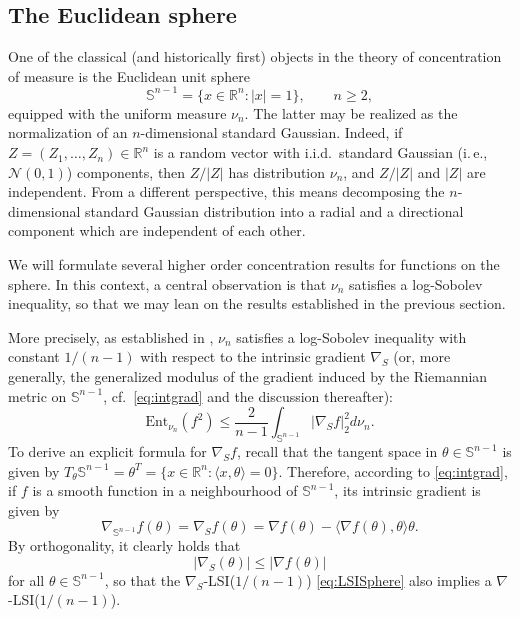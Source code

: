 \documentclass[a4paper,12pt]{amsart}
\numberwithin{equation}{section}
\theoremstyle{remark}
\def\R{{\mathbb R}}
\def\S{{\mathbb S}}
\begin{document}
\subsection{The Euclidean sphere}\label{sec:EuclSph}

One of the classical (and historically first) objects in the theory of concentration of measure is the Euclidean unit sphere
\[
\S^{n-1} = \{x \in \mathbb{R}^n \colon |x| = 1\},\qquad n \ge 2,
\]
equipped with the uniform measure $\nu_n$. The latter may be realized as the normalization of an $n$-dimensional standard Gaussian. Indeed, if $Z=(Z_1,\ldots,Z_n) \in \R^n$ is a random vector with i.i.d.\ standard Gaussian (i.\,e., $\mathcal{N}(0,1)$) components, then $Z/\lvert Z \rvert$ has distribution $\nu_n$, and $Z/\lvert Z \rvert$ and $\lvert Z \rvert$ are independent. From a different perspective, this means decomposing the $n$-dimensional standard Gaussian distribution into a radial and a directional component which are independent of each other.

We will formulate several higher order concentration results for functions on the sphere. In this context, a central observation is that $\nu_n$ satisfies a log-Sobolev inequality, so that we may lean on the results established in the previous section.

More precisely, as established in \cite{MW82}, $\nu_n$ satisfies a log-Sobolev inequality with constant $1/(n-1)$ with respect to the intrinsic gradient $\nabla_S$ (or, more generally, the generalized modulus of the gradient induced by the Riemannian metric on $\S^{n-1}$, cf.\ \eqref{eq:intgrad} and the discussion thereafter):
\begin{equation}\label{eq:LSISphere}
	\mathrm{Ent}_{\nu_n} (f^2) \le \frac{2}{n-1} \int_{\S^{n-1}} \lvert \nabla_S f \rvert_2^2 d\nu_n.
\end{equation}
To derive an explicit formula for $\nabla_S f$, recall that the tangent space in $\theta \in \S^{n-1}$ is given by $T_\theta\S^{n-1} = \theta^T = \{x \in \R^n \colon \langle x, \theta \rangle = 0\}$. Therefore, according to \eqref{eq:intgrad}, if $f$ is a smooth function in a neighbourhood of $\S^{n-1}$, its intrinsic gradient is given by
\begin{equation}\label{eq:FormelSphereGradient}
\nabla_{\S^{n-1}} f(\theta) = \nabla_S f(\theta) = \nabla f(\theta) - \langle \nabla f(\theta), \theta \rangle \theta.
\end{equation}
By orthogonality, it clearly holds that
\begin{equation}\label{eq:intrgradmin}
\lvert \nabla_S (\theta) \lvert \le \lvert \nabla f(\theta) \rvert
\end{equation}
for all $\theta \in \S^{n-1}$, so that the $\nabla_S$-LSI($1/(n-1)$) \eqref{eq:LSISphere} also implies a $\nabla$-LSI($1/(n-1)$).
\end{document}

